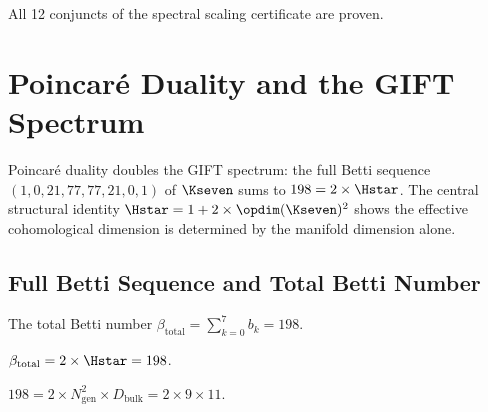 \begin{theorem}\label{thm:spectral_scaling_cert}
    \leanok
    All 12 conjuncts of the spectral scaling certificate are proven.
\end{theorem}


\chapter{Poincar\'e Duality and the GIFT Spectrum}\label{chap:poincare_duality}

Poincar\'e duality doubles the GIFT spectrum: the full Betti sequence
$(1, 0, 21, 77, 77, 21, 0, 1)$ of $\Kseven$ sums to $198 = 2 \times \Hstar$.
The central structural identity $\Hstar = 1 + 2 \times \opdim(\Kseven)^2$
shows the effective cohomological dimension is determined by the manifold
dimension alone.

\section{Full Betti Sequence and Total Betti Number}

\begin{definition}\label{def:total_betti}
    \leanok
    The total Betti number $\beta_{\mathrm{total}} = \sum_{k=0}^{7} b_k = 198$.
\end{definition}

\begin{theorem}\label{thm:total_betti_doubled}
    \leanok
    $\beta_{\mathrm{total}} = 2 \times \Hstar = 198$.
\end{theorem}

\begin{theorem}\label{thm:total_betti_factored}
    \leanok
    $198 = 2 \times N_{\mathrm{gen}}^2 \times D_{\mathrm{bulk}} = 2 \times 9 \times 11$.
\end{theorem}

